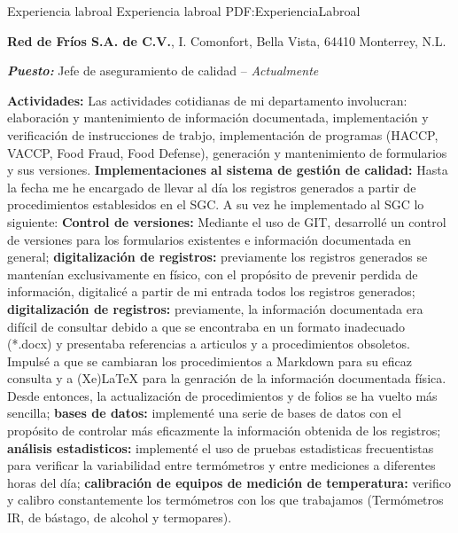 \Section
{Experiencia labroal}
{Experiencia labroal}
{PDF:ExperienciaLabroal}



\Entry
{\textbf{Red de Fríos S.A. de C.V.}},
\newline
I. Comonfort, Bella Vista, 64410 Monterrey, N.L.

\Gap
\BulletItem
\textbf{\textit{Puesto:}} Jefe de aseguramiento de calidad
\hfill
{} -- \textit{Actualmente}
\Gap
\begin{Detail}
\BulletItem \textbf{Actividades:}
    Las actividades cotidianas de mi departamento involucran: \compac elaboración y mantenimiento de información documentada, implementación y verificación de instrucciones de trabjo, implementación de programas (HACCP, VACCP, Food Fraud, Food Defense), generación y mantenimiento de formularios y sus versiones.
\Gap
    \BulletItem \textbf{Implementaciones al sistema de gestión de calidad:}
    Hasta la fecha me he encargado de llevar al día los registros generados a partir de procedimientos establesidos en el SGC. A su vez he implementado al SGC lo siguiente:
    \SubBulletItem
        \textbf{Control de versiones:} Mediante el uso de GIT, desarrollé un control de versiones para los formularios existentes e información documentada en general; 
    \SubBulletItem
        \textbf{digitalización de registros:} previamente los registros generados se mantenían exclusivamente en físico, con el propósito de prevenir perdida de información, digitalicé a partir de mi entrada todos los registros generados;
    \SubBulletItem
        \textbf{digitalización de registros:} previamente, la información documentada era difícil de consultar debido a que se encontraba en un formato inadecuado (*.docx) y presentaba referencias a articulos y a procedimientos obsoletos. Impulsé a que se cambiaran los procedimientos a Markdown para su eficaz consulta y a (Xe)LaTeX para la genración de la información documentada física. Desde entonces, la actualización de procedimientos y de folios se ha vuelto más sencilla;
    \SubBulletItem
        \textbf{bases de datos:} implementé una serie de bases de datos con el propósito de controlar más eficazmente la información obtenida de los registros;
    \SubBulletItem
        \textbf{análisis estadisticos:} implementé el uso de pruebas estadisticas frecuentistas para verificar la variabilidad entre termómetros y entre mediciones a diferentes horas del día;
    \SubBulletItem
        \textbf{calibración de equipos de medición de temperatura:} verifico y calibro constantemente los termómetros con los que trabajamos (Termómetros IR, de bástago, de alcohol y termopares).    
\end{Detail}
